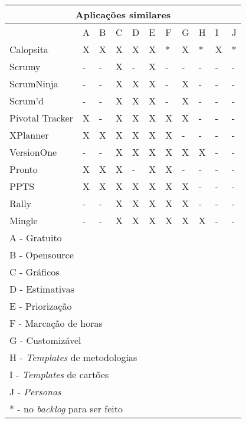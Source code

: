 \begin{tabular}{|l|l|l|l|l|l|l|l|l|l|l|}
	\hline
	\multicolumn{11}{|c|}{Aplicações similares} \\
	\hline
	                & A & B & C & D & E & F & G & H & I & J \\
	Calopsita       & X & X & X & X & X & * & X & * & X & * \\
	Scrumy          & - & - & X & - & X & - & - & - & - & - \\
	ScrumNinja      & - & - & X & X & X & - & X & - & - & - \\
	Scrum'd         & - & - & X & X & X & - & X & - & - & - \\
	Pivotal Tracker & X & - & X & X & X & X & X & - & - & - \\
	XPlanner        & X & X & X & X & X & X & - & - & - & - \\
	VersionOne      & - & - & X & X & X & X & X & X & - & - \\
	Pronto          & X & X & X & - & X & X & - & - & - & - \\
	PPTS            & X & X & X & X & X & X & X & - & - & - \\
	Rally           & - & - & X & X & X & X & X & - & - & - \\
	Mingle          & - & - & X & X & X & X & X & X & - & - \\
	\hline
	\multicolumn{11}{|l|}{A - Gratuito} \\
	\multicolumn{11}{|l|}{B - Opensource} \\
	\multicolumn{11}{|l|}{C - Gráficos} \\
	\multicolumn{11}{|l|}{D - Estimativas} \\
	\multicolumn{11}{|l|}{E - Priorização} \\
	\multicolumn{11}{|l|}{F - Marcação de horas} \\
	\multicolumn{11}{|l|}{G - Customizável} \\
	\multicolumn{11}{|l|}{H - \textit{Templates} de metodologias} \\
	\multicolumn{11}{|l|}{I - \textit{Templates} de cartões} \\
	\multicolumn{11}{|l|}{J - \textit{Personas}} \\
	\multicolumn{11}{|l|}{* - no \textit{backlog} para ser feito} \\
	\hline
\end{tabular}
